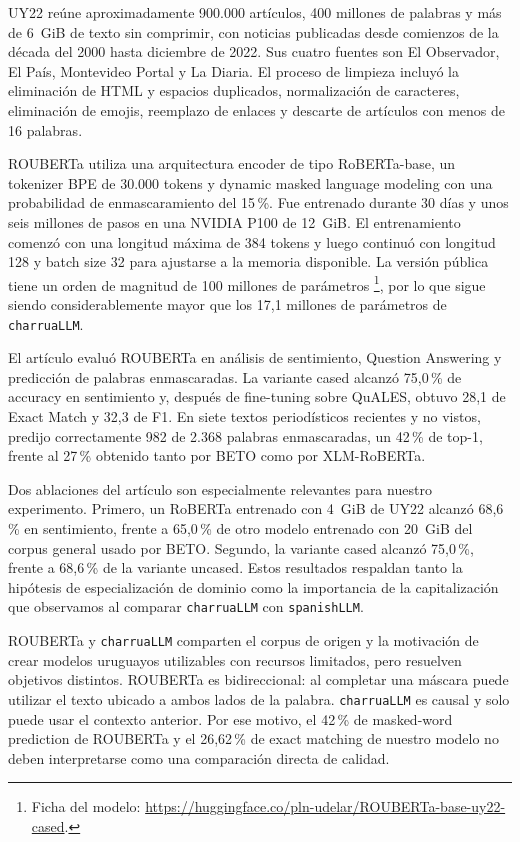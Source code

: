 \documentclass[11pt,a4paper]{article}
\newcommand{\charrua}{\texttt{charruaLLM}}
\newcommand{\spanishmodel}{\texttt{spanishLLM}}
\begin{document}
UY22 reúne aproximadamente 900.000 artículos, 400 millones de palabras y más
de 6~GiB de texto sin comprimir, con noticias publicadas desde comienzos de la
década del 2000 hasta diciembre de 2022. Sus cuatro fuentes son El Observador,
El País, Montevideo Portal y La Diaria. El proceso de limpieza incluyó la
eliminación de HTML y espacios duplicados, normalización de caracteres,
eliminación de emojis, reemplazo de enlaces y descarte de artículos con menos
de 16 palabras.

ROUBERTa utiliza una arquitectura encoder de tipo RoBERTa-base, un tokenizer
BPE de 30.000 tokens y dynamic masked language modeling con una probabilidad de
enmascaramiento del 15\,\%. Fue entrenado durante 30 días y unos seis millones
de pasos en una NVIDIA P100 de 12~GiB. El entrenamiento comenzó con una
longitud máxima de 384 tokens y luego continuó con longitud 128 y batch size 32
para ajustarse a la memoria disponible. La versión pública tiene un orden de
magnitud de 100 millones de parámetros
\footnote{Ficha del modelo: \url{https://huggingface.co/pln-udelar/ROUBERTa-base-uy22-cased}.},
por lo que sigue siendo considerablemente mayor que los 17,1 millones de
parámetros de \charrua.

El artículo evaluó ROUBERTa en análisis de sentimiento, Question Answering y
predicción de palabras enmascaradas. La variante cased alcanzó 75,0\,\% de
accuracy en sentimiento y, después de fine-tuning sobre QuALES, obtuvo 28,1 de
Exact Match y 32,3 de F1. En siete textos periodísticos recientes y no vistos,
predijo correctamente 982 de 2.368 palabras enmascaradas, un 42\,\% de top-1,
frente al 27\,\% obtenido tanto por BETO como por XLM-RoBERTa.

Dos ablaciones del artículo son especialmente relevantes para nuestro
experimento. Primero, un RoBERTa entrenado con 4~GiB de UY22 alcanzó 68,6\,\%
en sentimiento, frente a 65,0\,\% de otro modelo entrenado con 20~GiB del corpus
general usado por BETO. Segundo, la variante cased alcanzó 75,0\,\%, frente a
68,6\,\% de la variante uncased. Estos resultados respaldan tanto la hipótesis
de especialización de dominio como la importancia de la capitalización que
observamos al comparar \charrua{} con \spanishmodel.

ROUBERTa y \charrua{} comparten el corpus de origen y la motivación de crear
modelos uruguayos utilizables con recursos limitados, pero resuelven objetivos
distintos. ROUBERTa es bidireccional: al completar una máscara puede utilizar
el texto ubicado a ambos lados de la palabra. \charrua{} es causal y solo puede
usar el contexto anterior. Por ese motivo, el 42\,\% de masked-word prediction
de ROUBERTa y el 26,62\,\% de exact matching de nuestro modelo no deben
interpretarse como una comparación directa de calidad.
\end{document}
